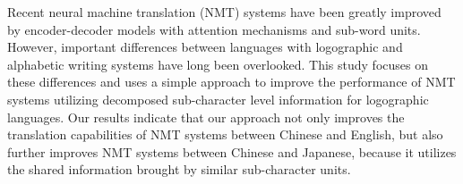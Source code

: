 Recent neural machine translation (NMT) systems have been greatly improved by encoder-decoder models with attention mechanisms and sub-word units. However, important differences between languages with logographic and alphabetic writing systems have long been overlooked. This study focuses on these differences and uses a simple approach to improve the performance of NMT systems utilizing decomposed sub-character level information for logographic languages. Our results indicate that our approach not only improves the translation capabilities of NMT systems between Chinese and English, but also further improves NMT systems between Chinese and Japanese, because it utilizes the shared information brought by similar sub-character units.
